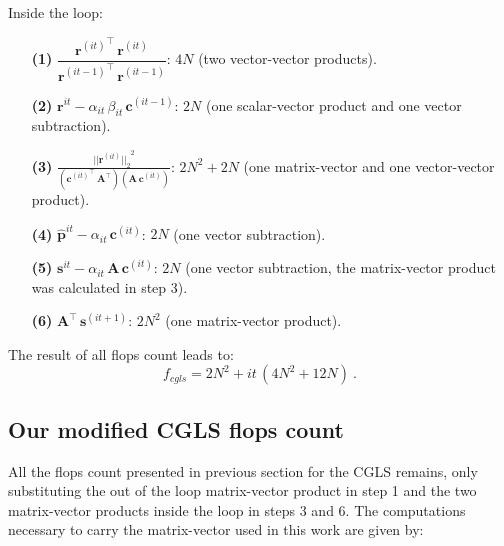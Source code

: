 Inside the loop:

\begin{itemize}
\item[\textbf{(1)}] $\dfrac{{\mathbf{r}^{(it)}}^{\top} \, \mathbf{r}^{(it)}} {{\mathbf{r}^{(it - 1)}}^{\top} \, \mathbf{r}^{(it - 1)}}$: $4 N$ (two vector-vector products).

\item[\textbf{(2)}] $\mathbf{r}^{it} - \alpha_{it} \,\beta_{it} \, \mathbf{c}^{(it - 1)}$: $2 N$ (one scalar-vector product and one vector subtraction).

\item[\textbf{(3)}] $\frac{{||\mathbf{r}^{(it)}||_2}^2}{({\mathbf{c}^{(it)}}^{\top} \, \mathbf{A}^{\top})(\mathbf{A} \, \mathbf{c}^{(it)})}$: $2 N^2 + 2N$ (one matrix-vector and one vector-vector product).

\item[\textbf{(4)}] $\hat{\mathbf{p}}^{it} - \alpha_{it} \, \mathbf{c}^{(it)}$: $2 N$ (one vector subtraction).

\item[\textbf{(5)}] $\mathbf{s}^{it} - \alpha_{it} \, \mathbf{A} \, \mathbf{c}^{(it)}$: $2 N$ (one vector subtraction, the matrix-vector product was calculated in step 3).

\item[\textbf{(6)}] $ \mathbf{A}^{\top} \, \mathbf{s}^{(it + 1)}$: $2 N^2$ (one matrix-vector product).
\end{itemize}
The result of all flops count leads to:
\begin{equation}
f_{cgls} =  2 N^{2} + it \, (4 N^{2} + 12 N) \: .
\label{eq:flops-cgls-append}
\end{equation}

\subsection{Our modified CGLS flops count}

All the flops count presented in previous section for the CGLS remains, only substituting the  out of the loop matrix-vector product in step 1 and the two matrix-vector products inside the loop in steps 3 and 6.
The computations necessary to carry the matrix-vector used in this work are given by:

